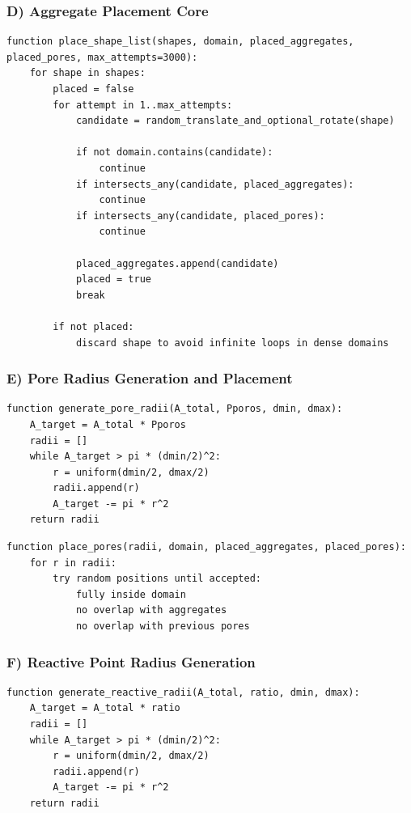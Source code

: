 ﻿\documentclass[11pt,a4paper]{article}
\begin{document}
\subsubsection*{D) Aggregate Placement Core}

\begin{lstlisting}[style=pseudo]
function place_shape_list(shapes, domain, placed_aggregates, placed_pores, max_attempts=3000):
	for shape in shapes:
		placed = false
		for attempt in 1..max_attempts:
			candidate = random_translate_and_optional_rotate(shape)

			if not domain.contains(candidate):
				continue
			if intersects_any(candidate, placed_aggregates):
				continue
			if intersects_any(candidate, placed_pores):
				continue

			placed_aggregates.append(candidate)
			placed = true
			break

		if not placed:
			discard shape to avoid infinite loops in dense domains
\end{lstlisting}


\subsubsection*{E) Pore Radius Generation and Placement}

\begin{lstlisting}[style=pseudo]
function generate_pore_radii(A_total, Pporos, dmin, dmax):
	A_target = A_total * Pporos
	radii = []
	while A_target > pi * (dmin/2)^2:
		r = uniform(dmin/2, dmax/2)
		radii.append(r)
		A_target -= pi * r^2
	return radii
\end{lstlisting}


\begin{lstlisting}[style=pseudo]
function place_pores(radii, domain, placed_aggregates, placed_pores):
	for r in radii:
		try random positions until accepted:
			fully inside domain
			no overlap with aggregates
			no overlap with previous pores
\end{lstlisting}


\subsubsection*{F) Reactive Point Radius Generation}

\begin{lstlisting}[style=pseudo]
function generate_reactive_radii(A_total, ratio, dmin, dmax):
	A_target = A_total * ratio
	radii = []
	while A_target > pi * (dmin/2)^2:
		r = uniform(dmin/2, dmax/2)
		radii.append(r)
		A_target -= pi * r^2
	return radii
\end{lstlisting}
\end{document}

